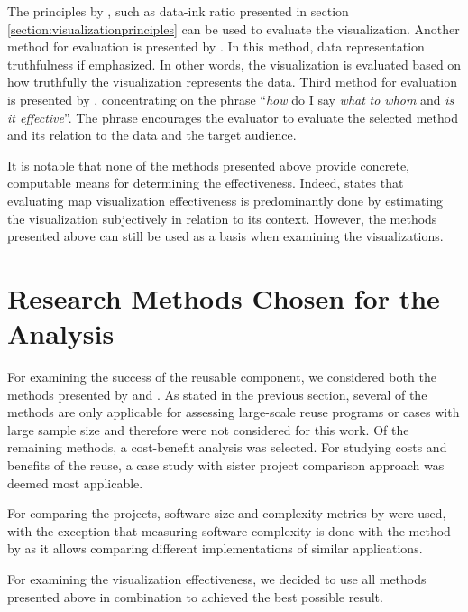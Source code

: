 The principles by \citet{tufte_visual_1986}, such as data-ink ratio presented in section \ref{section:visualizationprinciples} can be used to evaluate the visualization. Another method for evaluation is presented by \citet{azzam_j-b_2013}. In this method, data representation truthfulness if emphasized. In other words, the visualization is evaluated based on how truthfully the visualization represents the data. Third method for evaluation is presented by \citet{kraak_cartographic_1998}, concentrating on the phrase ``\emph{how} do I say \emph{what} \emph{to whom} and \emph{is it effective}''. The phrase encourages the evaluator to evaluate the selected method and its relation to the data and the target audience.

It is notable that none of the methods presented above provide concrete, computable means for determining the effectiveness. Indeed, \citet{kraak_cartographic_1998} states that evaluating map visualization effectiveness is predominantly done by estimating the visualization subjectively in relation to its context. However, the methods presented above can still be used as a basis when examining the visualizations.

\section{Research Methods Chosen for the Analysis}

For examining the success of the reusable component, we considered both the methods presented by \citet{frakes_software_1996} and \citet{mohagheghi_quality_2007}. As stated in the previous section, several of the methods are only applicable for assessing large-scale reuse programs or cases with large sample size and therefore were not considered for this work. Of the remaining methods, a cost-benefit analysis was selected. For studying costs and benefits of the reuse, a case study with sister project comparison approach was deemed most applicable. 

For comparing the projects, software size and complexity metrics by \citet{fenton_software_1998} were used, with the exception that measuring software complexity is done with the method by \citet{mccabe_complexity_1976} as it allows comparing different implementations of similar applications. 

For examining the visualization effectiveness, we decided to use all methods presented above in combination to achieved the best possible result.

